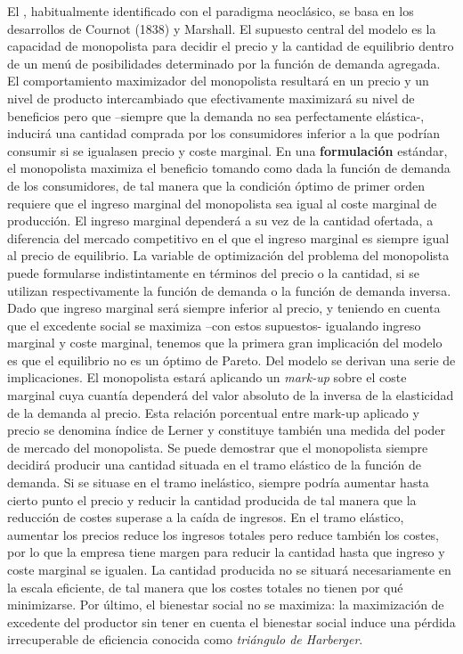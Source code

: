 \documentclass{nuevotema}
\begin{document}
El , habitualmente identificado con el paradigma neoclásico, se basa en los desarrollos de Cournot (1838) y Marshall. El supuesto central del modelo es la capacidad de monopolista para decidir el precio y la cantidad de equilibrio dentro de un menú de posibilidades determinado por la función de demanda agregada. El comportamiento maximizador del monopolista resultará en un precio y un nivel de producto intercambiado que efectivamente maximizará su nivel de beneficios pero que --siempre que la demanda no sea perfectamente elástica-, inducirá una cantidad comprada por los consumidores inferior a la que podrían consumir si se igualasen precio y coste marginal. En una \textbf{formulación} estándar, el monopolista maximiza el beneficio tomando como dada la función de demanda de los consumidores, de tal manera que la condición óptimo de primer orden requiere que el ingreso marginal del monopolista sea igual al coste marginal de producción. El ingreso marginal dependerá a su vez de la cantidad ofertada, a diferencia del mercado competitivo en el que el ingreso marginal es siempre igual al precio de equilibrio. La variable de optimización del problema del monopolista puede formularse indistintamente en términos del precio o la cantidad, si se utilizan respectivamente la función de demanda o la función de demanda inversa. Dado que ingreso marginal será siempre inferior al precio, y teniendo en cuenta que el excedente social se maximiza --con estos supuestos- igualando ingreso marginal y coste marginal, tenemos que la primera gran implicación del modelo es que el equilibrio no es un óptimo de Pareto. Del modelo se derivan una serie de implicaciones. El monopolista estará aplicando un \textit{mark-up} sobre el coste marginal cuya cuantía dependerá del valor absoluto de la inversa de la elasticidad de la demanda al precio. Esta relación porcentual entre mark-up aplicado y precio se denomina índice de Lerner y constituye también una medida del poder de mercado del monopolista. Se puede demostrar que el monopolista siempre decidirá producir una cantidad situada en el tramo elástico de la función de demanda. Si se situase en el tramo inelástico, siempre podría aumentar hasta cierto punto el precio y reducir la cantidad producida de tal manera que la reducción de costes superase a la caída de ingresos. En el tramo elástico, aumentar los precios reduce los ingresos totales pero reduce también los costes, por lo que la empresa tiene margen para reducir la cantidad hasta que ingreso y coste marginal se igualen. La cantidad producida no se situará necesariamente en la escala eficiente, de tal manera que los costes totales no tienen por qué minimizarse. Por último, el bienestar social no se maximiza: la maximización de excedente del productor sin tener en cuenta el bienestar social induce una pérdida irrecuperable de eficiencia conocida como \textit{triángulo de Harberger}.
\end{document}
